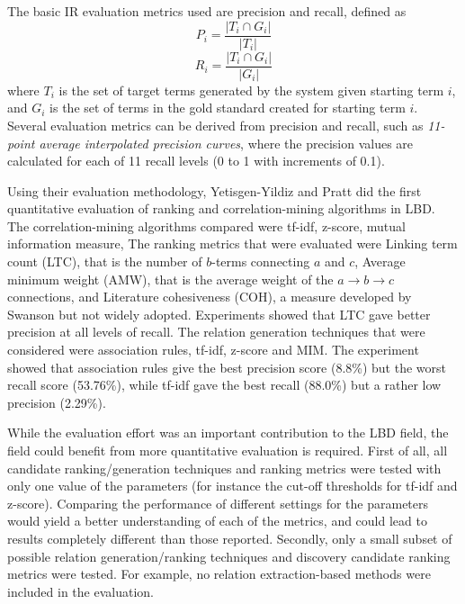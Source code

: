 The basic IR evaluation metrics used are precision and recall, defined as $$P_i = \frac{\vert T_i \cap G_i \vert}{\vert T_i \vert}$$ $$R_i = \frac{\vert T_i \cap G_i \vert}{\vert G_i \vert}$$ where $T_i$ is the set of target terms generated by the system given starting term $i$, and $G_i$ is the set of terms in the gold standard created for starting term $i$. Several evaluation metrics can be derived from precision and recall, such as \emph{11-point average interpolated precision curves}, where the precision values are calculated for each of 11 recall levels (0 to 1 with increments of 0.1).

Using their evaluation methodology, Yetisgen-Yildiz and Pratt did the first quantitative evaluation of ranking and correlation-mining algorithms in LBD. The correlation-mining algorithms compared were tf-idf, z-score, mutual information measure, The ranking metrics that were evaluated were Linking term count (LTC), that is the number of $b$-terms connecting $a$ and $c$, Average minimum weight (AMW), that is the average weight of the $a \to b \to c$  connections, and Literature cohesiveness (COH), a measure developed by Swanson but not widely adopted. Experiments showed that LTC gave better precision at all levels of recall. The relation generation techniques that were considered were association rules, tf-idf, z-score and MIM. The experiment showed that association rules give the best precision score (8.8\%) but the worst recall score (53.76\%), while tf-idf gave the best recall (88.0\%) but a rather low precision (2.29\%). 

While the evaluation effort was an important contribution to the LBD field, the field could benefit from more quantitative evaluation is required. First of all, all candidate ranking/generation techniques and ranking metrics were tested with only one value of the parameters (for instance the cut-off thresholds for tf-idf and z-score). Comparing the performance of different settings for the parameters would yield a better understanding of each of the metrics, and could lead to results completely different than those reported. Secondly, only a small subset of possible relation generation/ranking techniques and discovery candidate ranking metrics were tested. For example, no relation extraction-based methods were included in the evaluation.

